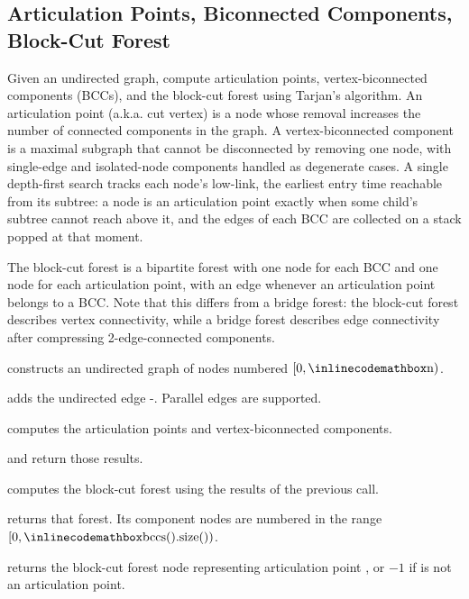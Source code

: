\subsection{Articulation Points, Biconnected Components, Block-Cut Forest}
\label{sec:4.2.5}
Given an undirected graph, compute articulation points, vertex-biconnected components (BCCs), and the block-cut forest using Tarjan's algorithm. An articulation point (a.k.a. cut vertex) is a node whose removal increases the number of connected components in the graph. A vertex-biconnected component is a maximal subgraph that cannot be disconnected by removing one node, with single-edge and isolated-node components handled as degenerate cases. A single depth-first search tracks each node's low-link, the earliest entry time reachable from its subtree: a node is an articulation point exactly when some child's subtree cannot reach above it, and the edges of each BCC are collected on a stack popped at that moment.

The block-cut forest is a bipartite forest with one node for each BCC and one node for each articulation point, with an edge whenever an articulation point belongs to a BCC. Note that this differs from a bridge forest: the block-cut forest describes vertex connectivity, while a bridge forest describes edge connectivity after compressing 2-edge-connected components.

\begin{compactitem}
  \item {} constructs an undirected graph of  nodes numbered $[0, {\inlinecodemath{n}})$.
  \item {} adds the undirected edge -. Parallel edges are supported.
  \item {} computes the articulation points and vertex-biconnected components.
  \item {} and  return those results.
  \item {} computes the block-cut forest using the results of the previous  call.
  \item {} returns that forest. Its component nodes are numbered in the range $[0, {\inlinecodemath{bccs().size()}})$.
  \item {} returns the block-cut forest node representing articulation point , or $-1$ if  is not an articulation point.
\end{compactitem}

